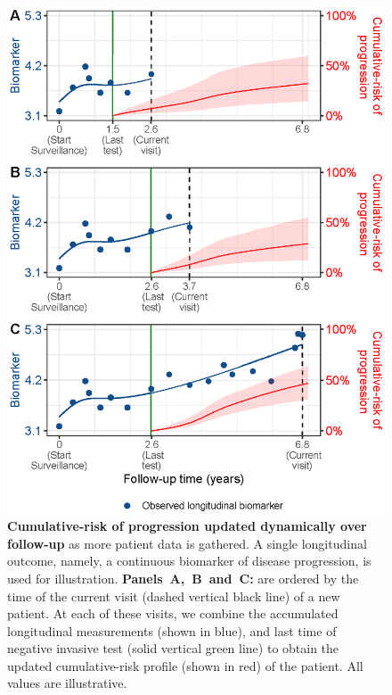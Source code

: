 \begin{figure}
\centerline{\includegraphics{images/dynrisk_plot_102.eps}}
\caption{\textbf{Cumulative-risk of progression updated dynamically over follow-up} as more patient data is gathered. A single longitudinal outcome, namely, a continuous biomarker of disease progression, is used for illustration. \textbf{Panels~A,~B~and~C:} are ordered by the time of the current visit (dashed vertical black line) of a new patient. At each of these visits, we combine the accumulated longitudinal measurements (shown in blue), and last time of negative invasive test (solid vertical green line) to obtain the updated cumulative-risk profile (shown in red) of the patient. All values are illustrative.} 
\label{fig:dynrisk_explanation}
\end{figure}

